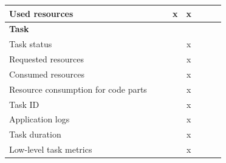 \begin{table}[htbp]
{\begin{tabular}{lccccccc}
            Used resources                      &                   &                               & x                        & x                   &                         &                           &                           \\
            \midrule
            \multicolumn{8}{l}{\textbf{Task}}                                                                                                                                                                                          \\[3pt]
            Task status                         &                   &                               &                          & x                   &                         &                           &                           \\
            Requested resources                 &                   &                               &                          & x                   &                         &                           &                           \\
            Consumed resources                  &                   &                               &                          & x                   &                         &                           &                           \\
            Resource consumption for code parts &                   &                               &                          & x                   &                         &                           &                           \\
            Task ID                             &                   &                               &                          & x                   &                         &                           &                           \\
            Application logs                    &                   &                               &                          & x                   &                         &                           &                           \\
            Task duration                       &                   &                               &                          & x                   &                         &                           &                           \\
            Low-level task metrics              &                   &                               &                          & x                   &                         &                           &                           \\

\end{tabular}}
\end{table}
